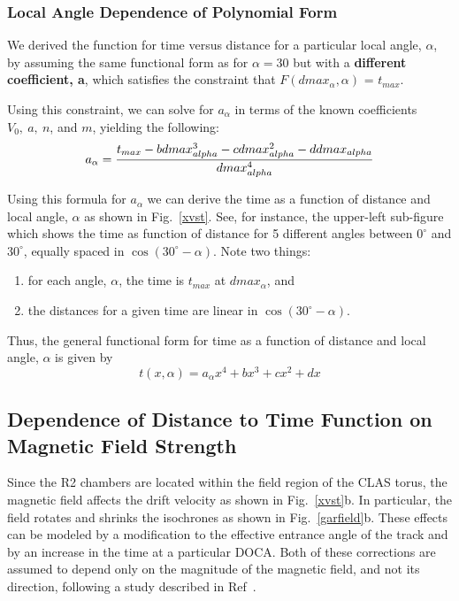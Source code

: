 \subsubsection{Local Angle Dependence of Polynomial Form}
We derived the function for time versus distance for a particular local angle, $\alpha$, by
assuming the same functional form as for $\alpha = 30$ but with a {\bf different coefficient, a}, which 
satisfies the constraint that  $F(dmax_{\alpha},\alpha)$ = $t_{max}$.

Using this constraint, we can solve for $a_{\alpha}$ in terms of the known coefficients $V_0, ~a, ~n$, and $m$,
yielding the following:
\begin{equation}
\label{aalphaequation}
a_{\alpha} = {{t_{max} - b dmax_{alpha}^3 - c dmax_{alpha}^2 - d dmax_{alpha}}\over{dmax_{alpha}^4}}
\end{equation}

Using this formula for $a_{\alpha}$ we can derive the time as a function of distance and local
angle, $\alpha$ as shown in Fig.~\ref{xvst}.  See, for instance, the upper-left sub-figure 
which shows the time as function of distance for 5 different angles between $0^{\circ}$ and 
$30^{\circ}$, equally spaced in $\cos \left(30^\circ-\alpha\right)$.  Note two things:
\begin{enumerate}
\item for each angle, $\alpha$, the time is $t_{max}$ at $dmax_{\alpha}$, and
\item the distances for a given time are linear in $\cos \left(30^\circ-\alpha\right)$.
\end{enumerate}

Thus, the general functional form for time as a function of distance and local angle, $\alpha$
is given by
\begin{equation}
\label{tfunctionofxandlocalangle}
t(x,\alpha) = a_{\alpha} x^4 + b x^3 + c x^2 + d x
\end{equation}




\subsection{Dependence of Distance to Time Function on Magnetic Field Strength}
Since the R2 chambers are located within the field region of the CLAS torus, the 
magnetic field affects the drift velocity as shown in 
Fig.~\ref{xvst}b.  In particular, the field rotates and shrinks the isochrones
as shown in Fig.~\ref{garfield}b.  These effects can be modeled by a 
modification to the effective entrance angle of the track and by an increase 
in the time at a particular DOCA.  Both of these corrections are assumed to depend only on the 
magnitude of the magnetic field, and not its direction, following a study 
described in Ref~\cite{MM-IEEE}.  

